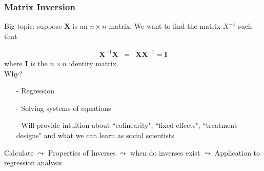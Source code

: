 \documentclass{beamer}
\numberwithin{equation}{section}
\begin{document}
\begin{frame}
\frametitle{\alert{Matrix Inversion}}

Big topic: suppose $\boldsymbol{X}$ is an $n \times n$ matrix.  We want to find the matrix $X^{-1}$ such that 

\begin{eqnarray}
\boldsymbol{X}^{-1} \boldsymbol{X} & = & \boldsymbol{X} \boldsymbol{X}^{-1} = \boldsymbol{I} \nonumber 
\end{eqnarray}
where $\boldsymbol{I}$ is the $n \times n$ identity matrix.  \\
\alert{Why}?
\begin{itemize}
\item[-] Regression
\item[-] Solving systems of equations
\item[-] \alert{Will provide intuition about ``colinearity", ``fixed effects", ``treatment designs" and what we can learn as social scientists}
\end{itemize}

Calculate $\leadsto$ Properties of Inverses $\leadsto$ when do inverses exist $\leadsto$ Application to regression analysis 

\end{frame}
\end{document}
